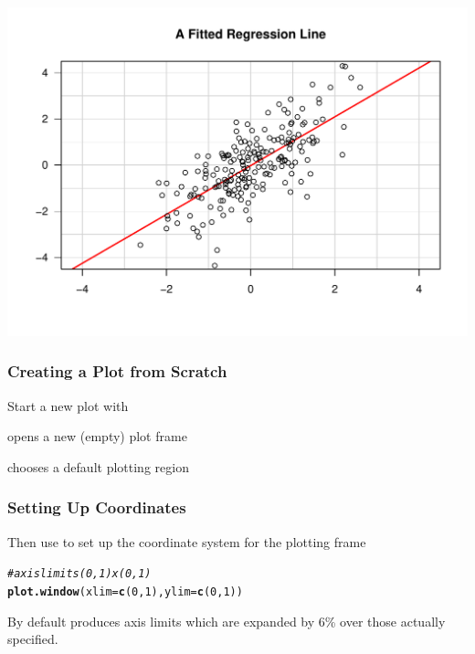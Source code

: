 \documentclass[12pt]{beamer}\usepackage[]{graphicx}\usepackage[]{color}
\makeatletter
\newcommand{\hlnum}[1]{\textcolor[rgb]{0.686,0.059,0.569}{#1}}%
\newcommand{\hlcom}[1]{\textcolor[rgb]{0.678,0.584,0.686}{\textit{#1}}}%
\newcommand{\hlstd}[1]{\textcolor[rgb]{0.345,0.345,0.345}{#1}}%
\newcommand{\hlkwc}[1]{\textcolor[rgb]{0.333,0.667,0.333}{#1}}%
\newcommand{\hlkwd}[1]{\textcolor[rgb]{0.737,0.353,0.396}{\textbf{#1}}}%
\newenvironment{kframe}{%
 \def\at@end@of@kframe{}%
 \ifinner\ifhmode%
  \def\at@end@of@kframe{\end{minipage}}%
  \begin{minipage}{\columnwidth}%
 \fi\fi%
 \def\FrameCommand##1{\hskip\@totalleftmargin \hskip-\fboxsep
 \colorbox{shadecolor}{##1}\hskip-\fboxsep
     \hskip-\linewidth \hskip-\@totalleftmargin \hskip\columnwidth}%
 \MakeFramed {\advance\hsize-\width
   \@totalleftmargin\z@ \linewidth\hsize
   \@setminipage}}%
 {\par\unskip\endMakeFramed%
 \at@end@of@kframe}
\newenvironment{knitrout}{}{} %
\makeatother
\begin{document}
\begin{frame}[fragile]
\begin{knitrout}\scriptsize
{}\color{fgcolor}

{\centering \includegraphics[width=.9\linewidth,height=.7\linewidth]{figure/ablines-1} 

}



\end{knitrout}
\end{frame}


\begin{frame}[fragile]
\frametitle{Creating a Plot from Scratch}

\bbi
  \item Start a new plot with 
  \item {} opens a new (empty) plot frame
  \item {} chooses a default plotting region
\ei

\end{frame}


\begin{frame}[fragile]
\frametitle{Setting Up Coordinates}

Then use  to set up the coordinate system for the plotting frame
\begin{knitrout}\footnotesize
{}\color{fgcolor}\begin{kframe}
\begin{alltt}
\hlcom{# axis limits (0,1)x(0,1)}
\hlkwd{plot.window}\hlstd{(}\hlkwc{xlim} \hlstd{=} \hlkwd{c}\hlstd{(}\hlnum{0}\hlstd{,} \hlnum{1}\hlstd{),} \hlkwc{ylim} \hlstd{=} \hlkwd{c}\hlstd{(}\hlnum{0}\hlstd{,} \hlnum{1}\hlstd{))}
\end{alltt}
\end{kframe}
\end{knitrout}
By default  produces axis limits which are expanded by 6\% over those actually specified. 

\end{frame}
\end{document}
